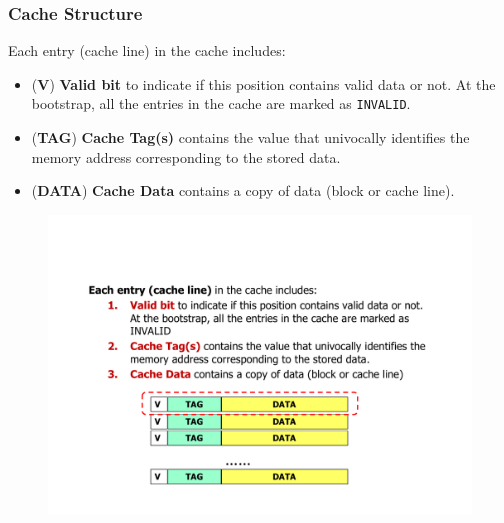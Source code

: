 \subsubsection{Cache Structure}

Each entry (cache line) in the cache includes:
\begin{itemize}
    \item (\textbf{V}) \textbf{Valid bit} to indicate if this position contains valid data or not. At the bootstrap, all the entries in the cache are marked as \texttt{INVALID}.

    \item (\textbf{TAG}) \textbf{Cache Tag(s)} contains the value that univocally identifies the memory address corresponding to the stored data.

    \item (\textbf{DATA}) \textbf{Cache Data} contains a copy of data (block or cache line).
\end{itemize}
\begin{figure}[!htp]
    \centering
    \includegraphics[width=.7\textwidth]{img/cache-structure-1.pdf}
\end{figure}

